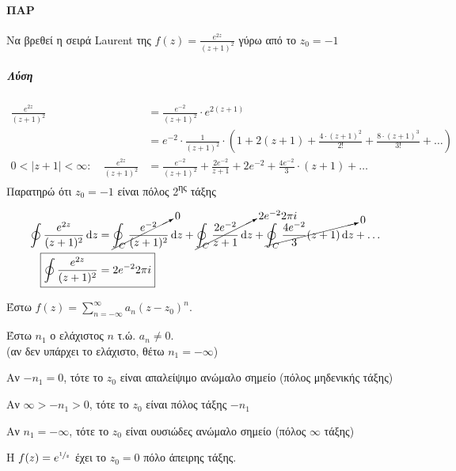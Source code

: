 \documentclass[12pt,a4paper,titlepage,fleqn]{article}
\begin{document}
  \paragraph{ΠΑΡ}
  Να βρεθεί η σειρά Laurent της \( f(z) = \frac{e^{2z}}{(z+1)^2} \) γύρω
  από το \( z_0 = -1 \)
  
  \subparagraph{Λύση}
  \begin{align*}
  \frac{e^{2z}}{(z+1)^2} &= \frac{e^{-2}}{(z+1)^2} \cdot e^{2(z+1)}
  \\ &= e^{-2} \cdot \frac{1}{(z+1)^2}\cdot\left(
  1+2(z+1)+\frac{4\cdot(z+1)^2}{2!}+\frac{8\cdot(z+1)^3}{3!}+\dots
  \right) \\ 0<|z+1|<\infty :\quad \frac{e^{2z}}{(z+1)^2} &=
  \frac{e^{-2}}{(z+1)^2}+\frac{2e^{-2}}{z+1}+2e^{-2}+\frac{4e^{-2}}{3}
  \cdot (z+1)+\dots
  \end{align*}
  Παρατηρώ ότι \( z_0=-1 \) είναι πόλος 2\textsuperscript{ης} τάξης
  
  \begin{align*}
  \oint \frac{e^{2z}}{(z+1)^2} \dif z &=
  \cancelto{0}{\oint_C \frac{e^{-2}}{(z+1)^2}}\dif z
  +\cancelto{2e^{-2}2\pi i}{\oint_C \frac{2e^{-2}}{z+1}\dif z}
  +\cancelto{0}{\oint_C \frac{4e^{-2}}{3}(z+1)\dif z} + \dots \\
  \Aboxed{\oint \frac{e^{2z}}{(z+1)^2} &= 2e^{-2}2\pi i}
  \end{align*}
  
  \begin{defn*}{}
  	Έστω \( \displaystyle f(z) = \sum_{n=-\infty}^\infty a_n(z-z_0)^n \).
  	
  	Έστω \( n_1 \) ο ελάχιστος \( n \) τ.ώ. \( a_n \neq 0 \). \\
  	(αν δεν υπάρχει το ελάχιστο, θέτω \( n_1=-\infty \))
  	
  	\begin{enumgreek}
  		\item Αν \( -n_1 = 0 \), τότε το \( z_0 \) είναι απαλείψιμο ανώμαλο
  		σημείο (πόλος μηδενικής τάξης)
  		\item Αν \( \infty > -n_1 > 0 \), τότε το \( z_0 \) είναι πόλος τάξης
  		\( -n_1 \)
  		\item Αν \( n_1 = -\infty \), τότε το \( z_0 \) είναι ουσιώδες ανώμαλο
  		σημείο (πόλος \( \infty \) τάξης)
  	\end{enumgreek}
  \end{defn*}
  
  Η \( f(z) = e^{\sfrac{1}{z} } \) έχει το \( z_0 = 0 \) πόλο άπειρης τάξης.
  
\end{document}
